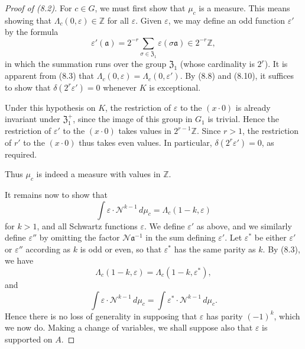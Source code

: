 \documentclass[12pt,a4paper]{article}
\theoremstyle{plain}
\theoremstyle{definition}
\theoremstyle{remark}
\begin{document}
\begin{proof}[Proof of (8.2)]
For $c \in G$, we must first show that $\mu_c$ is a measure. This means showing that $\varLambda_c(0, \varepsilon) \in \mathbb{Z}$ for all $\varepsilon$. Given $\varepsilon$, we may define an odd function $\varepsilon'$ by the formula
\[
\varepsilon'(\mathfrak{a}) = 2^{-r} \sum_{\sigma \in \mathfrak{Z}_1} \varepsilon(\sigma\mathfrak{a}) \in 2^{-r}\mathbb{Z},
\]
in which the summation runs over the group $\mathfrak{Z}_1$ (whose cardinality is $2^r$). It is apparent from (8.3) that $\varLambda_c(0, \varepsilon) = \varLambda_c(0, \varepsilon')$. By (8.8) and (8.10), it suffices to show that $\delta(2^r\varepsilon') = 0$ whenever $K$ is exceptional.

Under this hypothesis on $K$, the restriction of $\varepsilon$ to the $(x \cdot 0)$ is already invariant under $\mathfrak{Z}_1^+$, since the image of this group in $G_1$ is trivial. Hence the restriction of $\varepsilon'$ to the $(x \cdot 0)$ takes values in $2^{r-1}\mathbb{Z}$. Since $r > 1$, the restriction of $r'$ to the $(x \cdot 0)$ thus takes even values. In particular, $\delta(2^r\varepsilon') = 0$, as required.

Thus $\mu_c$ is indeed a measure with values in $\mathbb{Z}$.

It remains now to show that
\[
\int \varepsilon \cdot \mathcal{N}^{k-1} \, d\mu_c = \varLambda_c(1-k, \varepsilon)
\]
for $k > 1$, and all Schwartz functions $\varepsilon$. We define $\varepsilon'$ as above, and we similarly define $\varepsilon''$ by omitting the factor $\mathcal{N}\mathfrak{a}^{-1}$ in the sum defining $\varepsilon'$. Let $\varepsilon^*$ be either $\varepsilon'$ or $\varepsilon''$ according as $k$ is odd or even, so that $\varepsilon^*$ has the same parity as $k$. By (8.3), we have
\[
\varLambda_c(1-k, \varepsilon) = \varLambda_c(1-k, \varepsilon^*),
\]
and
\[
\int \varepsilon \cdot \mathcal{N}^{k-1} \, d\mu_c = \int \varepsilon^* \cdot \mathcal{N}^{k-1} \, d\mu_c.
\]
Hence there is no loss of generality in supposing that $\varepsilon$ has parity $(-1)^k$, which we now do. Making a change of variables, we shall suppose also that $\varepsilon$ is supported on $A$.


\end{proof}
\end{document}
